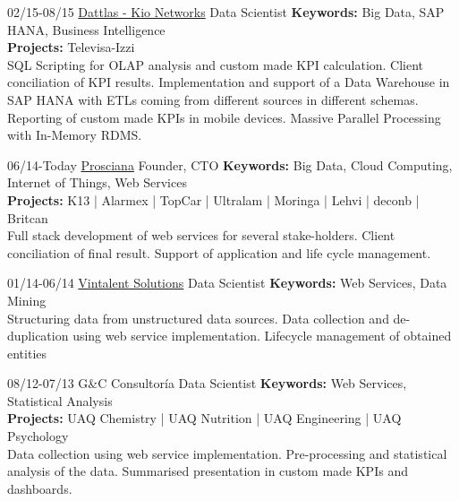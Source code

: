 \documentclass[]{friggeri-cv}
\begin{document}
\begin{entrylist}
\entry
{02/15-08/15}
{\href{http://www.dattlas.com}{Dattlas - Kio Networks}}
{Data Scientist} 
{\textbf{Keywords:} Big Data, SAP HANA, Business Intelligence\\
\textbf{Projects:} Televisa-Izzi \\
\footnotesize SQL Scripting for OLAP analysis and custom made KPI calculation.
Client conciliation of KPI results.
Implementation and support of a Data Warehouse in SAP HANA with ETLs coming from different sources in different schemas. Reporting of custom made KPIs in mobile devices. Massive Parallel Processing with In-Memory RDMS.
}

\entry
{06/14-Today}
{\href{http://www.prosciana.com}{Prosciana}}
{Founder, CTO} 
{\textbf{Keywords:} Big Data, Cloud Computing, Internet of Things, Web Services\\
\textbf{Projects:} K13 | Alarmex | TopCar | Ultralam | Moringa | Lehvi | deconb | Britcan\\
\footnotesize Full stack development of web services for several stake-holders.
Client conciliation of final result.
Support of application and life cycle management.
}

\entry
{01/14-06/14}
{\href{http://www.vintalent.com}{Vintalent Solutions}}
{Data Scientist}
{\textbf{Keywords:} Web Services, Data Mining\\
	\footnotesize Structuring data from unstructured data sources.
	Data collection and de-duplication using web service implementation.
	Lifecycle management of obtained entities}


\entry
{%
08/12-07/13}
{G\&C Consultor\'{i}a}
{Data Scientist}
{\textbf{Keywords:} Web Services, Statistical Analysis\\
\textbf{Projects:} UAQ Chemistry | UAQ Nutrition | UAQ Engineering | UAQ Psychology \\
\footnotesize Data collection using web service implementation.
Pre-processing and statistical analysis of the data.
Summarised presentation in custom made KPIs and dashboards.
}



%
\end{entrylist}
\end{document}
